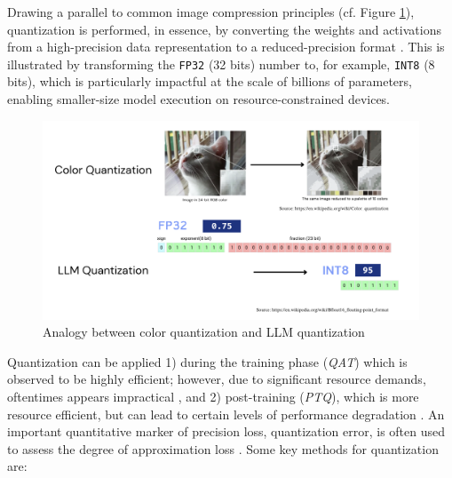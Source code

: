 \documentclass[conference]{IEEEtran}
\begin{document}
Drawing a parallel to common image compression principles (cf. Figure \ref{fig:quantvisual}), quantization is performed, in essence, by converting the weights and activations from a high-precision data representation to a reduced-precision format \cite{zhao2025benchmarking, bai2024beyond}. This is illustrated by transforming the \verb|FP32| (32 bits) number to, for example, \verb|INT8| (8 bits), which is particularly impactful at the scale of billions of parameters, enabling smaller-size model execution on resource-constrained devices.

\begin{figure}[ht]
\includegraphics[width=\columnwidth]{img}
    \caption{Analogy between color quantization and LLM quantization}
    \label{fig:quantvisual}
\end{figure}

Quantization can be applied 1) during the training phase (\textit{QAT}) which is observed to be highly efficient; however, due to significant resource demands, oftentimes appears impractical \cite{chen2024EfficientQAT}, and 2) post-training (\textit{PTQ}), which is more resource efficient, but can lead to certain levels of performance degradation \cite{shen2024exploring}. An important quantitative marker of precision loss, quantization error, is often used to assess the degree of approximation loss \cite{lin2024AWQ}. Some key methods for quantization are:
\end{document}
